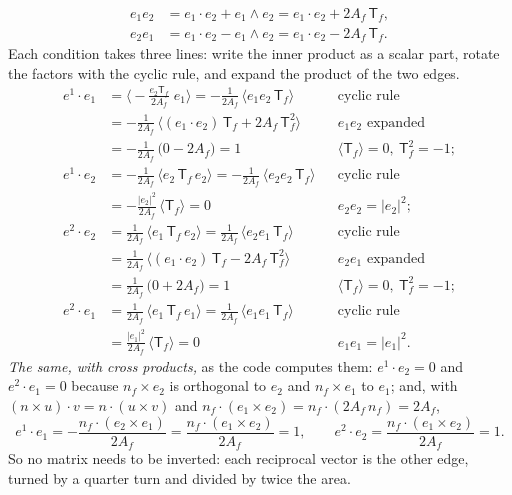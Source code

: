 \begin{align*}
e_1 e_2 &= e_1\cdot e_2 + e_1\wedge e_2 = e_1\cdot e_2 + 2A_f\,\mathsf T_f , \\
e_2 e_1 &= e_1\cdot e_2 - e_1\wedge e_2 = e_1\cdot e_2 - 2A_f\,\mathsf T_f .
\end{align*}
Each condition takes three lines: write the inner product as a scalar part, rotate the factors with the cyclic rule, and expand the product of the two edges.
\begin{align*}
e^1\cdot e_1 &= \Big\langle -\frac{e_2\mathsf T_f}{2A_f}\; e_1\Big\rangle = -\frac{1}{2A_f}\,\langle e_1 e_2\,\mathsf T_f\rangle && \text{cyclic rule} \\
&= -\frac{1}{2A_f}\,\big\langle (e_1\cdot e_2)\,\mathsf T_f + 2A_f\,\mathsf T_f^2\big\rangle && e_1e_2 \text{ expanded} \\
&= -\frac{1}{2A_f}\,\big(0 - 2A_f\big) = 1 && \langle\mathsf T_f\rangle = 0,\ \mathsf T_f^2 = -1 ; \\[4pt]
e^1\cdot e_2 &= -\frac{1}{2A_f}\,\langle e_2\,\mathsf T_f\, e_2\rangle = -\frac{1}{2A_f}\,\langle e_2 e_2\,\mathsf T_f\rangle && \text{cyclic rule} \\
&= -\frac{|e_2|^2}{2A_f}\,\langle\mathsf T_f\rangle = 0 && e_2e_2 = |e_2|^2 ; \\[4pt]
e^2\cdot e_2 &= \frac{1}{2A_f}\,\langle e_1\,\mathsf T_f\, e_2\rangle = \frac{1}{2A_f}\,\langle e_2 e_1\,\mathsf T_f\rangle && \text{cyclic rule} \\
&= \frac{1}{2A_f}\,\big\langle (e_1\cdot e_2)\,\mathsf T_f - 2A_f\,\mathsf T_f^2\big\rangle && e_2e_1 \text{ expanded} \\
&= \frac{1}{2A_f}\,\big(0 + 2A_f\big) = 1 && \langle\mathsf T_f\rangle = 0,\ \mathsf T_f^2 = -1 ; \\[4pt]
e^2\cdot e_1 &= \frac{1}{2A_f}\,\langle e_1\,\mathsf T_f\, e_1\rangle = \frac{1}{2A_f}\,\langle e_1 e_1\,\mathsf T_f\rangle && \text{cyclic rule} \\
&= \frac{|e_1|^2}{2A_f}\,\langle\mathsf T_f\rangle = 0 && e_1e_1 = |e_1|^2 .
\end{align*}
\emph{The same, with cross products,} as the code computes them: $e^1\cdot e_2 = 0$ and $e^2\cdot e_1 = 0$ because $n_f\times e_2$ is orthogonal to $e_2$ and $n_f\times e_1$ to $e_1$; and, with $(n\times u)\cdot v = n\cdot(u\times v)$ and $n_f\cdot(e_1\times e_2) = n_f\cdot(2A_f\, n_f) = 2A_f$,
\begin{equation*}
e^1\cdot e_1 = -\frac{n_f\cdot(e_2\times e_1)}{2A_f} = \frac{n_f\cdot(e_1\times e_2)}{2A_f} = 1, \qquad e^2\cdot e_2 = \frac{n_f\cdot(e_1\times e_2)}{2A_f} = 1 .
\end{equation*}
So no matrix needs to be inverted: each reciprocal vector is the other edge, turned by a quarter turn and divided by twice the area.


